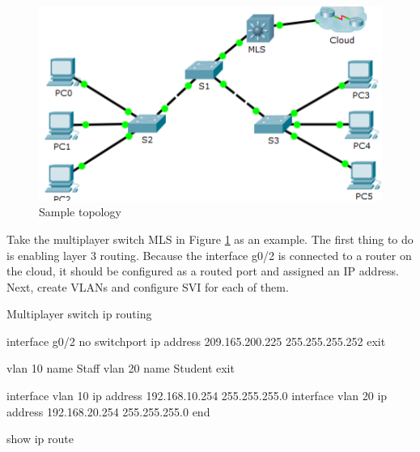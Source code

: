 \begin{figure}[hbtp]
\caption{Sample topology}\label{Layer3topology}
\centering
\includegraphics[scale=0.6]{pictures/Layer3topology.PNG}
\end{figure}

Take the multiplayer switch MLS in Figure \ref{Layer3topology} as an example. The first thing to do is enabling layer 3 routing. Because the interface g0/2 is connected to a router on the cloud, it should be configured as a routed port and assigned an IP address. Next, create VLANs and configure SVI for each of them.

\begin{sexylisting}{Multiplayer switch}
ip routing

interface g0/2
  no switchport
  ip address 209.165.200.225 255.255.255.252
exit

vlan 10
  name Staff
vlan 20
  name Student  
exit

interface vlan 10
  ip address 192.168.10.254 255.255.255.0
interface vlan 20
  ip address 192.168.20.254 255.255.255.0  
end

show ip route  
\end{sexylisting}